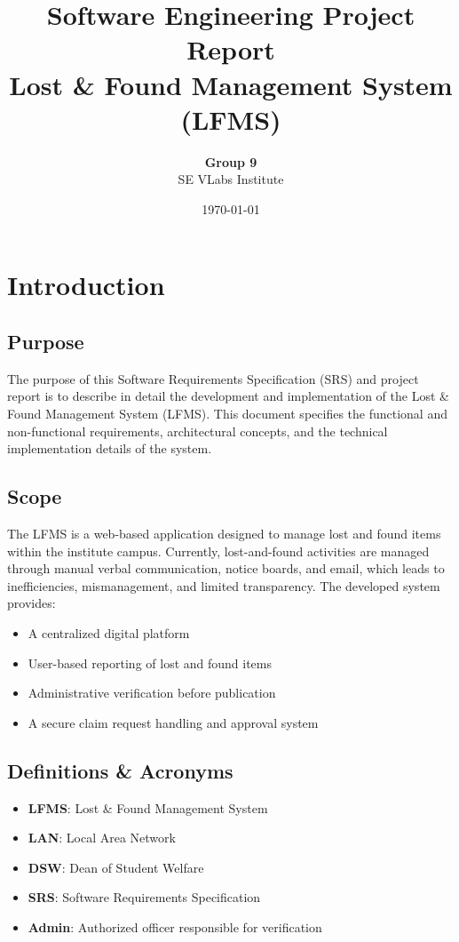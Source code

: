 \documentclass[12pt, a4paper]{article}
\title{
    \vspace{2cm}
    \textbf{Software Engineering Project Report}\\
    \vspace{1cm}
    \Large \textbf{Lost \& Found Management System (LFMS)}
    \vspace{2cm}
}
\author{
    \textbf{Group 9}\\
    SE VLabs Institute
}
\date{\today}
\begin{document}
\maketitle
\newpage

\tableofcontents
\newpage

\section{Introduction}
\subsection{Purpose}
The purpose of this Software Requirements Specification (SRS) and project report is to describe in detail the development and implementation of the Lost \& Found Management System (LFMS). This document specifies the functional and non-functional requirements, architectural concepts, and the technical implementation details of the system.

\subsection{Scope}
The LFMS is a web-based application designed to manage lost and found items within the institute campus. Currently, lost-and-found activities are managed through manual verbal communication, notice boards, and email, which leads to inefficiencies, mismanagement, and limited transparency. 
The developed system provides:
\begin{itemize}
    \item A centralized digital platform
    \item User-based reporting of lost and found items
    \item Administrative verification before publication
    \item A secure claim request handling and approval system
\end{itemize}

\subsection{Definitions \& Acronyms}
\begin{itemize}
    \item \textbf{LFMS}: Lost \& Found Management System
    \item \textbf{LAN}: Local Area Network
    \item \textbf{DSW}: Dean of Student Welfare
    \item \textbf{SRS}: Software Requirements Specification
    \item \textbf{Admin}: Authorized officer responsible for verification
\end{itemize}
\end{document}
